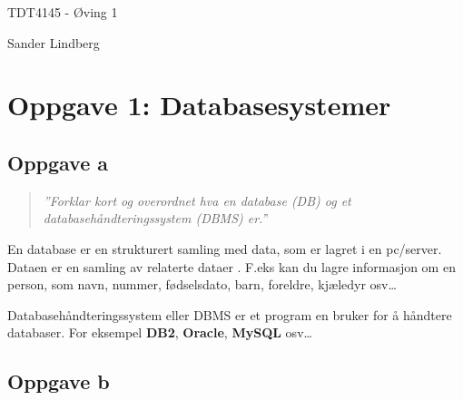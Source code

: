 \documentclass[12pt,a4paper]{article}
\begin{document}
\begin{titlepage}
    \centering
    \vspace*{\fill}

    \vspace*{0.5cm}

    \huge
    TDT4145 - Øving 1

    \vspace*{0.5cm}

    \large Sander Lindberg

    \vspace*{\fill}
    \end{titlepage}

	\newpage
	
	\section{Oppgave 1: Databasesystemer}
		\subsection{Oppgave a}
			\begin{quote}
				\textit{''Forklar kort og overordnet hva en database (DB) og et databasehåndteringssystem
				(DBMS) er.'}'
			\end{quote}
			En database er en strukturert samling med data, som er lagret i en pc/server. Dataen er en samling av relaterte dataer 			. F.eks kan du lagre informasjon om en person, som navn, nummer, fødselsdato, barn, foreldre, kjæledyr osv\dots
			
			Databasehåndteringssystem eller DBMS er et program en bruker for å håndtere databaser. For eksempel 									\textbf{DB2}, \textbf{Oracle}, \textbf{MySQL} osv\dots
			
		\subsection{Oppgave b}
				
		
\end{document}
